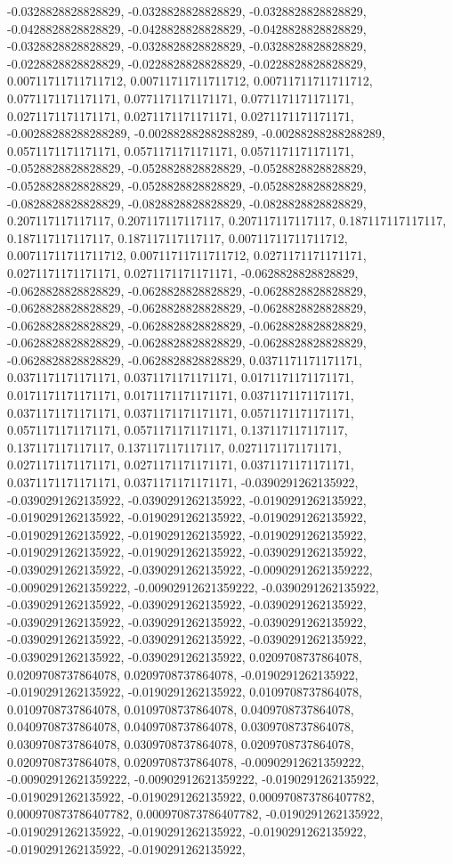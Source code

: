 \documentclass[
  ,man]{apa6}
\begin{document}
-0.0328828828828829, -0.0328828828828829, -0.0328828828828829, -0.0428828828828829, -0.0428828828828829, -0.0428828828828829, -0.0328828828828829, -0.0328828828828829, -0.0328828828828829, -0.0228828828828829, -0.0228828828828829, -0.0228828828828829, 0.00711711711711712, 0.00711711711711712, 0.00711711711711712, 0.0771171171171171, 0.0771171171171171, 0.0771171171171171, 0.0271171171171171, 0.0271171171171171, 0.0271171171171171, -0.00288288288288289, -0.00288288288288289, -0.00288288288288289,
0.0571171171171171, 0.0571171171171171, 0.0571171171171171, -0.0528828828828829, -0.0528828828828829, -0.0528828828828829, -0.0528828828828829, -0.0528828828828829, -0.0528828828828829, -0.0828828828828829, -0.0828828828828829, -0.0828828828828829, 0.207117117117117, 0.207117117117117, 0.207117117117117, 0.187117117117117, 0.187117117117117, 0.187117117117117, 0.00711711711711712, 0.00711711711711712, 0.00711711711711712, 0.0271171171171171, 0.0271171171171171, 0.0271171171171171, -0.0628828828828829,
-0.0628828828828829, -0.0628828828828829, -0.0628828828828829, -0.0628828828828829, -0.0628828828828829, -0.0628828828828829, -0.0628828828828829, -0.0628828828828829, -0.0628828828828829, -0.0628828828828829, -0.0628828828828829, -0.0628828828828829, -0.0628828828828829, -0.0628828828828829, 0.0371171171171171, 0.0371171171171171, 0.0371171171171171, 0.0171171171171171, 0.0171171171171171, 0.0171171171171171, 0.0371171171171171, 0.0371171171171171, 0.0371171171171171, 0.0571171171171171, 0.0571171171171171,
0.0571171171171171, 0.137117117117117, 0.137117117117117, 0.137117117117117, 0.0271171171171171, 0.0271171171171171, 0.0271171171171171, 0.0371171171171171, 0.0371171171171171, 0.0371171171171171, -0.0390291262135922, -0.0390291262135922, -0.0390291262135922, -0.0190291262135922, -0.0190291262135922, -0.0190291262135922, -0.0190291262135922, -0.0190291262135922, -0.0190291262135922, -0.0190291262135922, -0.0190291262135922, -0.0190291262135922, -0.0390291262135922, -0.0390291262135922, -0.0390291262135922,
-0.00902912621359222, -0.00902912621359222, -0.00902912621359222, -0.0390291262135922, -0.0390291262135922, -0.0390291262135922, -0.0390291262135922, -0.0390291262135922, -0.0390291262135922, -0.0390291262135922, -0.0390291262135922, -0.0390291262135922, -0.0390291262135922, -0.0390291262135922, -0.0390291262135922, 0.0209708737864078, 0.0209708737864078, 0.0209708737864078, -0.0190291262135922, -0.0190291262135922, -0.0190291262135922, 0.0109708737864078, 0.0109708737864078, 0.0109708737864078,
0.0409708737864078, 0.0409708737864078, 0.0409708737864078, 0.0309708737864078, 0.0309708737864078, 0.0309708737864078, 0.0209708737864078, 0.0209708737864078, 0.0209708737864078, -0.00902912621359222, -0.00902912621359222, -0.00902912621359222, -0.0190291262135922, -0.0190291262135922, -0.0190291262135922, 0.000970873786407782, 0.000970873786407782, 0.000970873786407782, -0.0190291262135922, -0.0190291262135922, -0.0190291262135922, -0.0190291262135922, -0.0190291262135922, -0.0190291262135922,
\end{document}
